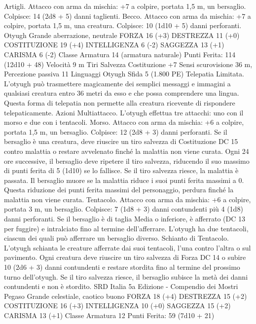 \begin{multicols}{2}
Artigli. Attacco con arma da mischia: +7 a colpire, portata 1,5
m, un bersaglio.
Colpisce: 14 (2d8 + 5) danni taglienti.
Becco. Attacco con arma da mischia: +7 a colpire, portata 1,5 m,
una creatura.
Colpisce: 10 (1d10 + 5) danni perforanti.
Otyugh
Grande aberrazione, neutrale
FORZA 16 (+3)
DESTREZZA 11 (+0)
COSTITUZIONE 19 (+4)
INTELLIGENZA 6 (-2)
SAGGEZZA 13 (+1)
CARISMA 6 (-2)
Classe Armatura 14 (armatura naturale)
\hspace*{0pt}\hfill{Punti Ferita}: 114 (12d10 + 48)
Velocità 9 m
Tiri Salvezza Costituzione +7
Sensi scurovisione 36 m, Percezione passiva 11
Linguaggi Otyugh
Sfida 5 (1.800 PE)
Telepatia Limitata. L’otyugh può trasmettere magicamente dei
semplici messaggi e immagini a qualsiasi creatura entro 36 metri
da esso e che possa comprendere una lingua. Questa forma di
telepatia non permette alla creatura ricevente di rispondere
telepaticamente.
Azioni
Multiattacco. L’otyugh effettua tre attacchi: uno con il morso e
due con i tentacoli.
Morso. Attacco con arma da mischia: +6 a colpire, portata 1,5
m, un bersaglio.
Colpisce: 12 (2d8 + 3) danni perforanti. Se il bersaglio è una
creatura, deve riuscire un tiro salvezza di Costituzione DC 15
contro malattia o restare avvelenato finché la malattia non viene
curata. Ogni 24 ore successive, il bersaglio deve ripetere il tiro
salvezza, riducendo il suo massimo di punti ferita di 5 (1d10) se
lo fallisce. Se il tiro salvezza riesce, la malattia è passata. Il
bersaglio muore se la malattia riduce i suoi punti ferita massimi a
0. Questa riduzione dei punti ferita massimi del personaggio,
perdura finché la malattia non viene curata.
Tentacolo. Attacco con arma da mischia: +6 a colpire, portata 3
m, un bersaglio.
Colpisce: 7 (1d8 + 3) danni contundenti più 4 (1d8) danni
perforanti. Se il bersaglio è di taglia Media o inferiore, è
afferrato (DC 13 per fuggire) e intralciato fino al termine
dell’afferrare. L’otyugh ha due tentacoli, ciascun dei quali può
afferrare un bersaglio diverso.
Schianto di Tentacolo. L’otyugh schianta le creature afferrate
dai suoi tentacoli, l’una contro l’altra o sul pavimento. Ogni
creatura deve riuscire un tiro salvezza di Forza DC 14 o subire
10 (2d6 + 3) danni contundenti e restare stordita fino al termine
del prossimo turno dell’otyugh. Se il tiro salvezza riesce, il
bersaglio subisce la metà dei danni contundenti e non è stordito.
SRD Italia 5a Edizione - Compendio dei Mostri
Pegaso
Grande celestiale, caotico buono
FORZA 18 (+4)
DESTREZZA 15 (+2)
COSTITUZIONE 16 (+3)
INTELLIGENZA 10 (+0)
SAGGEZZA 15 (+2)
CARISMA 13 (+1)
Classe Armatura 12
\hspace*{0pt}\hfill{Punti Ferita}: 59 (7d10 + 21)

\end{multicols}
